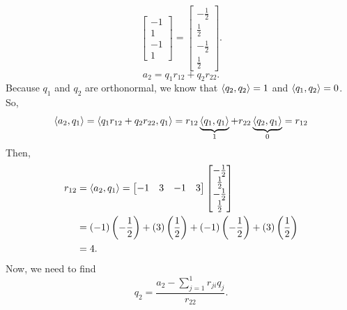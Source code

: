 \documentclass[letterpaper]{article}
\newcommand{\0}{\mathbf{0}}
\begin{document}
\begin{mdframed}
\begin{mdframed}
\[\begin{bmatrix}
            -1 \\ 1 \\ -1 \\ 1 
        \end{bmatrix} = \begin{bmatrix}
            -\frac{1}{2} \\ \frac{1}{2} \\ -\frac{1}{2} \\ \frac{1}{2}
        \end{bmatrix}.\]
        \[a_2 = q_1 r_{12} + q_2 r_{22}.\]
        Because $q_1$ and $q_2$ are orthonormal, we know that $\langle q_2, q_2 \rangle = 1$ and $\langle q_1, q_2 \rangle = 0$. So, \[\langle a_2, q_1 \rangle = \langle q_1 r_{12} + q_2 r_{22}, q_1 \rangle = r_{12} \underbrace{\langle q_1, q_1 \rangle}_{1} + r_{22} \underbrace{\langle q_2, q_1 \rangle}_{0} = r_{12}\]
        Then, 
        \begin{equation*}
            \begin{aligned}
                r_{12} &= \langle a_{2}, q_{1} \rangle= \begin{bmatrix}
                        -1 & 3 & -1 & 3
                    \end{bmatrix} \begin{bmatrix}
                        -\frac{1}{2} \\ \frac{1}{2} \\ -\frac{1}{2} \\ \frac{1}{2}
                    \end{bmatrix} \\ 
                    &= (-1) \left(-\frac{1}{2}\right) + (3) \left(\frac{1}{2}\right) + (-1)\left(-\frac{1}{2}\right) + (3)\left(\frac{1}{2}\right) \\ 
                    &= 4.
            \end{aligned}
        \end{equation*}
        Now, we need to find 
        \[q_2 = \frac{a_2 - \sum_{j = 1}^{1} r_{ji}q_j}{r_{22}}.\]
    \end{mdframed}


\end{mdframed}
\end{document}
